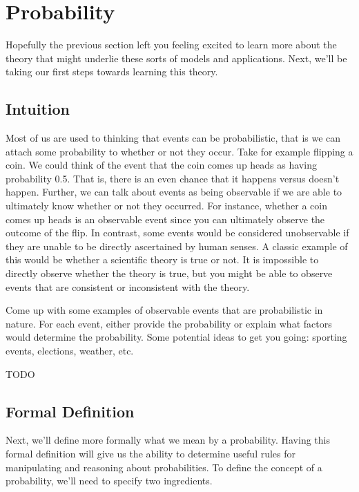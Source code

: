 \documentclass[assignment01_Solutions]{subfiles}
\begin{document}
\section{Probability}

Hopefully the previous section left you feeling excited to learn more about the theory that might underlie these sorts of models and applications.  Next, we'll be taking our first steps towards learning this theory.

\subsection{Intuition}
Most of us are used to thinking that events can be probabilistic, that is we can attach some probability to whether or not they occur.  Take for example flipping a coin.  We could think of the event that the coin comes up heads as having probability 0.5.  That is, there is an even chance that it happens versus doesn’t happen.  Further, we can talk about events as being observable if we are able to ultimately know whether or not they occurred.  For instance, whether a coin comes up heads is an observable event since you can ultimately observe the outcome of the flip.  In contrast, some events would be considered unobservable if they are unable to be directly ascertained by human senses.  A classic example of this would be whether a scientific theory is true or not.  It is impossible to directly observe whether the theory is true, but you might be able to observe events that are consistent or inconsistent with the theory.

\vspace{1em}
\begin{exercise}[(10 minutes)]
Come up with some examples of observable events that are probabilistic in nature.  For each event, either provide the probability or explain what factors would determine the probability.  Some potential ideas to get you going: sporting events, elections, weather, etc.

\begin{boxedsolution}
TODO
\end{boxedsolution}

\end{exercise}

\subsection{Formal Definition}

Next, we'll define more formally what we mean by a probability.  Having this formal definition will give us the ability to determine useful rules for manipulating and reasoning about probabilities.  To define the concept of a probability, we'll need to specify two ingredients.
\end{document}
